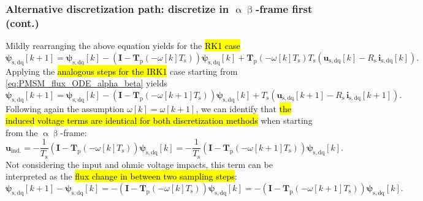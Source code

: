 \begin{frame}
    \frametitle{Alternative discretization path: discretize in $\upalpha\upbeta$-frame first (cont.)}
    Mildly rearranging the above equation yields for the \hl{RK1 case}
    \begin{equation}
        \bm{\psi}_{\mathrm{s,dq}}[k+1] = \bm{\psi}_{\mathrm{s,dq}}[k] - \left(\bm{I} -\bm{T}_\mathrm{p}(-\omega[k]T_\mathrm{s})\right)\bm{\psi}_{\mathrm{s,dq}}[k]+\bm{T}_\mathrm{p}(-\omega[k]T_\mathrm{s})T_\mathrm{s}\left(\bm{u}_{\mathrm{s,dq}}[k] - R_\mathrm{s}\,\bm{i}_{\mathrm{s,dq}}[k]\right).
    \end{equation}\pause
    Applying the \hl{analogous steps for the IRK1} case starting from \eqref{eq:PMSM_flux_ODE_alpha_beta} yields
    \begin{equation}
        \bm{\psi}_{\mathrm{s,dq}}[k+1] = \bm{\psi}_{\mathrm{s,dq}}[k] - \left(\bm{I} -\bm{T}_\mathrm{p}(-\omega[k+1]T_\mathrm{s})\right)\bm{\psi}_{\mathrm{s,dq}}[k]+T_\mathrm{s}\left(\bm{u}_{\mathrm{s,dq}}[k+1] - R_\mathrm{s}\,\bm{i}_{\mathrm{s,dq}}[k+1]\right).
    \end{equation}\pause
    Following again the assumption $\omega[k]=\omega[k+1]$, we can identify that \hl{the induced voltage terms are identical for both discretization methods} when starting from the $\upalpha\upbeta$-frame:
    \begin{equation*}
        \bm{u}_\mathrm{ind.}=-\frac{1}{T_\mathrm{s}}\left(\bm{I} -\bm{T}_\mathrm{p}(-\omega[k]T_\mathrm{s})\right)\bm{\psi}_{\mathrm{s,dq}}[k] = -\frac{1}{T_\mathrm{s}}\left(\bm{I} -\bm{T}_\mathrm{p}(-\omega[k+1]T_\mathrm{s})\right)\bm{\psi}_{\mathrm{s,dq}}[k].
    \end{equation*}\pause
    Not considering the input and ohmic voltage impacts, this term can be interpreted as the \hl{flux change in between two sampling steps}:
    \begin{equation*}
        \bm{\psi}_{\mathrm{s,dq}}[k+1] - \bm{\psi}_{\mathrm{s,dq}}[k]=-\left(\bm{I} -\bm{T}_\mathrm{p}(-\omega[k]T_\mathrm{s})\right)\bm{\psi}_{\mathrm{s,dq}}[k]=-\left(\bm{I} -\bm{T}_\mathrm{p}(-\omega[k+1]T_\mathrm{s})\right)\bm{\psi}_{\mathrm{s,dq}}[k].
    \end{equation*}
\end{frame}

